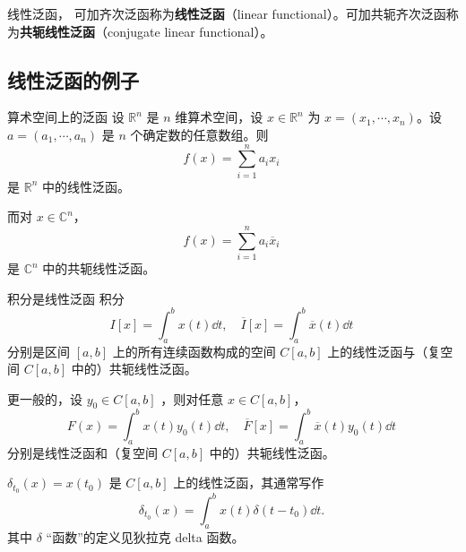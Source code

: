 \begin{definition}{线性泛函，}
可加齐次泛函称为\textbf{线性泛函}（linear functional）。可加共轭齐次泛函称为\textbf{共轭线性泛函}（conjugate linear functional）。
\end{definition}


\subsection{线性泛函的例子}

\begin{example}{算术空间上的泛函}
设 $\mathbb R^n$ 是 $n$ 维算术空间，设 $x\in\mathbb R^n$ 为 $x=(x_1,\cdots,x_n)$。设 $a=(a_1,\cdots,a_n)$ 是 $n$ 个确定数的任意数组。则
\begin{equation}
f(x)=\sum_{i=1}^n a_ix_i~
\end{equation}
是 $\mathbb R^n$ 中的线性泛函。

而对 $x\in\mathbb C^n$，
\begin{equation}
f(x)=\sum_{i=1}^n a_i\overline x_i~
\end{equation}
是  $\mathbb C^n$ 中的共轭线性泛函。

\end{example}


\begin{example}{积分是线性泛函}
积分
\begin{equation}
I[x]=\int_a^b x(t)\dd t,\quad \overline I[x]=\int_a^b \overline x(t)\dd t~
\end{equation}
分别是区间 $[a,b]$ 上的所有连续函数构成的空间 $C[a,b]$ 上的线性泛函与（复空间 $C[a,b]$ 中的）共轭线性泛函。
\end{example}

\begin{example}{}
更一般的，设 $y_0\in C[a,b]$ ，则对任意 $x\in C[a,b]$，
\begin{equation}
F(x)=\int_a^b x(t)y_0(t)\dd t,\quad\overline{F}[x]=\int_a^b \overline{x}(t)y_0(t)\dd t~
\end{equation}
分别是线性泛函和（复空间 $C[a,b]$ 中的）共轭线性泛函。
\end{example}

\begin{example}{}
$\delta_{t_0}(x)=x(t_0)$ 是 $C[a,b]$ 上的线性泛函，其通常写作
\begin{equation}
\delta_{t_0}(x)=\int_a^b x(t)\delta(t-t_0)\dd t.~
\end{equation}
其中 $\delta$ “函数”的定义见狄拉克 delta 函数。
\end{example}






